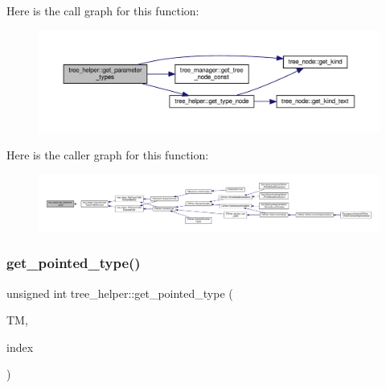 Here is the call graph for this function\+:
\nopagebreak
\begin{figure}[H]
\begin{center}
\leavevmode
\includegraphics[width=350pt]{d7/d99/classtree__helper_ab377de808719926b9d9097bbbf3a329a_cgraph}
\end{center}
\end{figure}
Here is the caller graph for this function\+:
\nopagebreak
\begin{figure}[H]
\begin{center}
\leavevmode
\includegraphics[width=350pt]{d7/d99/classtree__helper_ab377de808719926b9d9097bbbf3a329a_icgraph}
\end{center}
\end{figure}
\mbox{\label{classtree__helper_a44773dce45000b8e7283c452ff972dc1}} 
\subsubsection{\texorpdfstring{get\+\_\+pointed\+\_\+type()}{get\_pointed\_type()}}
{\footnotesize\ttfamily unsigned int tree\+\_\+helper\+::get\+\_\+pointed\+\_\+type (\begin{DoxyParamCaption}\item[{const \hyperlink{tree__manager_8hpp_a792e3f1f892d7d997a8d8a4a12e39346}{tree\+\_\+manager\+Const\+Ref}}]{TM,  }\item[{const unsigned int}]{index }\end{DoxyParamCaption})\hspace{0.3cm}{\ttfamily [static]}}



